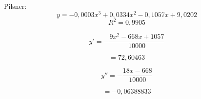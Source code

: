 Pilsner:\\
\[y = -0,0003x^3+0,0334x^2-0,1057x+9,0202\]
\[R^2 = 0,9905\]

\[y' = -\frac{9x^2-668x+1057}{10000}\]

\[= 72,60463\]

\[y'' = -\frac{18x-668}{10000}\]

\[= -0,06388833\]












